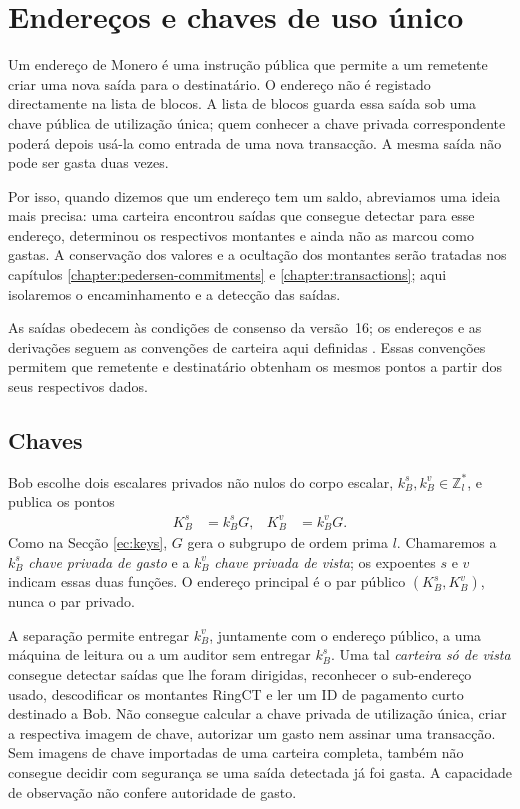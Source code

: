 \chapter{Endereços e chaves de uso único}
\label{chapter:addresses}

Um endereço de Monero é uma instrução pública que permite a um remetente criar
uma nova saída para o destinatário. O endereço não é registado directamente na
lista de blocos. A lista de blocos guarda essa saída sob uma chave pública de
utilização única; quem conhecer a chave privada correspondente poderá depois
usá-la como entrada de uma nova transacção. A mesma saída não pode ser gasta
duas vezes.

Por isso, quando dizemos que um endereço tem um saldo, abreviamos uma ideia
mais precisa: uma carteira encontrou saídas que consegue detectar para esse
endereço, determinou os respectivos montantes e ainda não as marcou como
gastas. A conservação dos valores e a ocultação dos montantes serão tratadas
nos capítulos \ref{chapter:pedersen-commitments} e \ref{chapter:transactions};
aqui isolaremos o encaminhamento e a detecção das saídas.

As saídas obedecem às condições de consenso da versão~16; os endereços e as
derivações seguem as convenções de carteira aqui definidas
\cite{monero-source-v16}. Essas convenções permitem que remetente e
destinatário obtenham os mesmos pontos a partir dos seus respectivos dados.

\section{Chaves}
\label{sec:user-keys}

Bob escolhe dois escalares privados não nulos do corpo escalar,
\(k_B^s,k_B^v\in\mathbb{Z}_l^*\), e publica os pontos
\begin{align*}
 K_B^s&=k_B^sG, & K_B^v&=k_B^vG.
\end{align*}
Como na Secção \ref{ec:keys}, \(G\) gera o subgrupo de ordem prima \(l\).
Chamaremos a \(k_B^s\) \emph{chave privada de gasto} e a \(k_B^v\)
\emph{chave privada de vista}; os expoentes \(s\) e \(v\) indicam
essas duas funções. O endereço principal é o par público
\((K_B^s,K_B^v)\), nunca o par privado.

A separação permite entregar \(k_B^v\), juntamente com o endereço público, a
uma máquina de leitura ou a um auditor sem entregar \(k_B^s\). Uma tal
\emph{carteira só de vista} consegue detectar saídas que lhe foram dirigidas,
reconhecer o sub-endereço usado, descodificar os montantes RingCT e ler um ID
de pagamento curto destinado a Bob. Não consegue calcular a chave privada de
utilização única, criar a respectiva imagem de chave, autorizar um gasto nem
assinar uma transacção. Sem imagens de chave importadas de uma carteira
completa, também não consegue decidir com segurança se uma saída detectada já
foi gasta. A capacidade de observação não confere autoridade de gasto.

